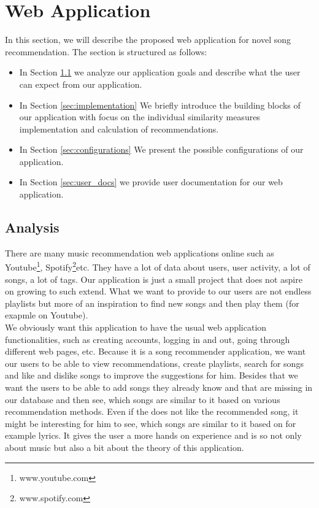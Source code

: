 \chapter{Web Application}\label{chap:web_app}

In this section, we will describe the proposed web application for novel song recommendation. The section is structured as follows: 
\begin{itemize}
    \item In Section \ref{sec:analysis} we analyze our application goals and describe what the user can expect from our application.
    \item In Section \ref{sec:implementation} We briefly introduce the building blocks of our application with focus on the individual similarity measures implementation and calculation of recommendations.
    \item In Section \ref{sec:configurations} We present the possible configurations of our application.
    \item In Section \ref{sec:user_docs} we provide user documentation for our web application.
\end{itemize}

\section{Analysis}\label{sec:analysis}

There are many music recommendation web applications online such as Youtube\footnote{www.youtube.com}, Spotify\footnote{www.spotify.com}etc. They have a lot of data about users, user activity, a lot of songs, a lot of tags. Our application is just a small project that does not aspire on growing to such extend. What we want to provide to our users are not endless playlists but more of an inspiration to find new songs and then play them (for exapmle on Youtube). \\
We obviously want this application to have the usual web application functionalities, such as creating accounts, logging in and out, going through different web pages, etc. Because it is a song recommender application, we want our users to be able to view recommendations, create playlists, search for songs and like and dislike songs to improve the suggestions for him. Besides that we want the users to be able to add songs they already know and that are missing in our database and then see, which songs are similar to it based on various recommendation methods. Even if the does not like the recommended song, it might be interesting for him to see, which songs are similar to it based on for example lyrics. It gives the user a more hands on experience and is so not only about music but also a bit about the theory of this application. \\

